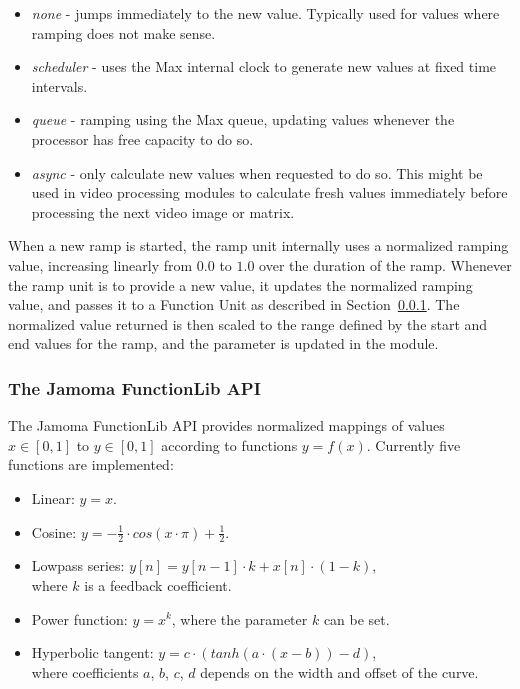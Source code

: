 \documentclass{NIME-alternate}
\begin{document}
\begin{itemize}

	\item \emph{none} - jumps immediately to the new value. Typically used for values where ramping does not make sense.

	\item \emph{scheduler} - uses the Max internal clock to generate new values at fixed time intervals.

	\item \emph{queue} - ramping using the Max queue, updating values whenever the processor has free capacity to do so.

	\item \emph{async} - only calculate new values when requested to do so. This might be used in video processing modules to calculate fresh values immediately before processing the next video image or matrix.
	
\end{itemize}

When a new ramp is started, the ramp unit internally uses a normalized ramping value, increasing linearly from $0.0$ to $1.0$ over the duration of the ramp. Whenever the ramp unit is to provide a new value, it updates the normalized ramping value, and passes it to a Function Unit as described in Section~\ref{ssub:the_function_lib}. The normalized value returned is then scaled to the range defined by the start and end values for the ramp, and the parameter is updated in the module.



\subsubsection{The Jamoma FunctionLib API} %
\label{ssub:the_function_lib}

The Jamoma FunctionLib API provides normalized mappings of values $x \in [0,1]$ to $y \in [0,1]$ according to functions $y = f(x)$. Currently five functions are implemented: 

\begin{itemize}

	\item Linear: $y = x$.

	\item Cosine: $y = - \frac{1}{2} \cdot cos(x \cdot \pi ) + \frac{1}{2} $.

	\item Lowpass series: $y[n] = y[n-1] \cdot k + x[n] \cdot (1-k)$, \\ where $k$ is a feedback coefficient.

	\item Power function: $ y = x^{k} $, where the parameter $k$ can be set.

	\item Hyperbolic tangent: $ y = c \cdot (tanh(a\cdot(x-b)) - d) $, \\ where coefficients $a$, $b$, $c$, $d$ depends on the width and offset of the curve.
	
\end{itemize}
\end{document}
